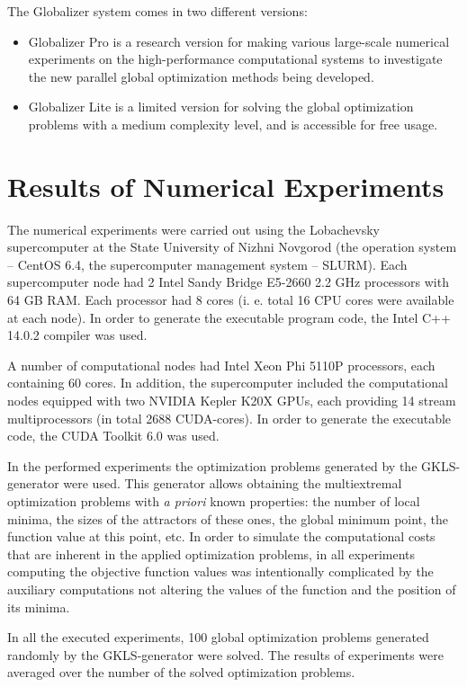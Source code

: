 \documentclass{aims}
\theoremstyle{definition}
\begin{document}
\par
The Globalizer system comes in two different versions:
\begin{itemize}
  \item Globalizer Pro is a research version for making various large-scale numerical experiments on the high-performance computational systems to investigate the new parallel global optimization methods being developed.
  \item Globalizer Lite is a limited version for solving the global optimization problems with a medium complexity level, and is accessible for free usage.
\end{itemize}

\section{Results of Numerical Experiments}
\label{sec:experiments}
The numerical experiments were carried out using the Lobachevsky supercomputer at
the State University of Nizhni Novgorod (the operation system – CentOS 6.4, the
supercomputer management system – SLURM). Each supercomputer node had 2 Intel Sandy Bridge
E5-2660 2.2 GHz processors with 64 GB RAM. Each processor had 8 cores (i. e. total
16 CPU cores were available at each node). In order to generate the executable program code, the Intel C++ 14.0.2 compiler was used.
\par
A number of computational nodes had Intel Xeon Phi 5110P processors, each containing 60 cores. In addition, the supercomputer included the computational nodes equipped
with two NVIDIA Kepler K20X GPUs, each providing 14 stream multiprocessors (in total 2688 CUDA-cores). In order to generate the executable code, the CUDA Toolkit 6.0 was used.
\par
In the performed experiments the optimization problems generated by the GKLS-generator
\cite{gavianoKvasovLeraSergeev2003} were used. This generator allows obtaining the multiextremal optimization
problems with \textit{a priori} known properties: the number of local minima, the sizes of the attractors of these ones, the global minimum point, the function value at this point, etc. In order to simulate the computational costs that are inherent in the applied optimization problems, in all experiments computing the objective function values was intentionally complicated by the auxiliary computations not altering the values of the function and the position of its minima.
\par
In all the executed experiments, 100 global optimization problems generated randomly by the GKLS-generator were solved. The results of experiments were averaged over the number of the solved optimization problems.
\end{document}
